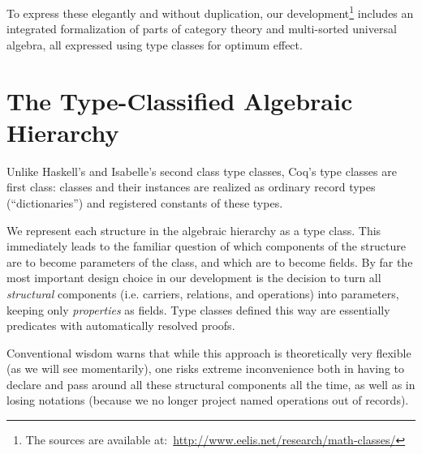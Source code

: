 \documentclass{llncs}
\begin{document}
To express these elegantly and without duplication, our development\footnote{The sources are available
at:~\url{http://www.eelis.net/research/math-classes/}} includes an integrated formalization of parts of category theory and multi-sorted universal algebra, all expressed using type classes for optimum effect.


\section{The Type-Classified Algebraic Hierarchy}\label{classes}

Unlike Haskell's and Isabelle's second class type classes, Coq's type classes are first class: classes and their instances are realized as ordinary record types (``dictionaries'') and registered constants of these types.

We represent each structure in the algebraic hierarchy as a type class. This immediately leads to the familiar question of which components of the structure are to become parameters of the class, and which are to become fields. By far the most important design choice in our development is the decision to turn all \emph{structural} components (i.e. carriers, relations, and operations) into parameters, keeping only \emph{properties} as fields. Type classes defined this way are essentially predicates with automatically resolved proofs.

Conventional wisdom warns that while this approach is theoretically very flexible (as we will see momentarily), one risks extreme inconvenience both in having to declare and pass around all these structural components all the time, as well as in losing notations (because we no longer project named operations out of records).
\end{document}
